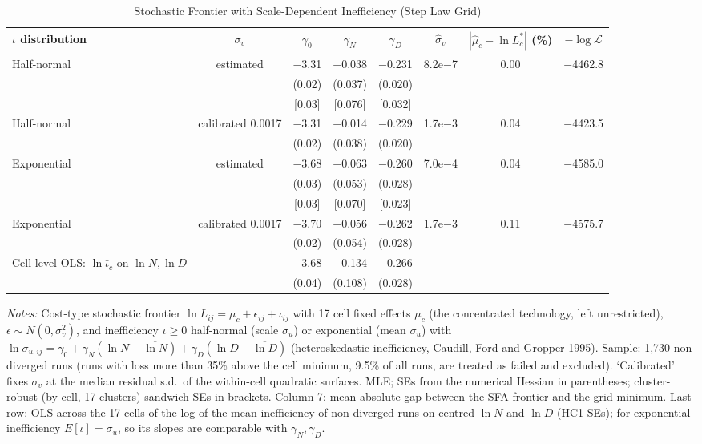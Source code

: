 \begin{table}[htbp]
\centering
\scriptsize
\begin{threeparttable}
\caption{Stochastic Frontier with Scale-Dependent Inefficiency (Step Law Grid)}
\label{tab:m8_sfa}
\begin{tabular}{lccccccc}
\toprule
$\iota$ distribution & $\sigma_v$ & $\gamma_0$ & $\gamma_N$ & $\gamma_D$ & $\hat\sigma_v$ & $|\hat\mu_c-\ln L^*_c|$ (\%) & $-\log\mathcal{L}$ \\
\midrule
Half-normal & estimated & $-$3.31 & $-$0.038 & $-$0.231 & 8.2e$-$7 & 0.00 & $-$4462.8 \\
 & & (0.02) & (0.037) & (0.020) & & &  \\
 & & [0.03] & [0.076] & [0.032] & & &  \\
Half-normal & calibrated 0.0017 & $-$3.31 & $-$0.014 & $-$0.229 & 1.7e$-$3 & 0.04 & $-$4423.5 \\
 & & (0.02) & (0.038) & (0.020) & & &  \\
Exponential & estimated & $-$3.68 & $-$0.063 & $-$0.260 & 7.0e$-$4 & 0.04 & $-$4585.0 \\
 & & (0.03) & (0.053) & (0.028) & & &  \\
 & & [0.03] & [0.070] & [0.023] & & &  \\
Exponential & calibrated 0.0017 & $-$3.70 & $-$0.056 & $-$0.262 & 1.7e$-$3 & 0.11 & $-$4575.7 \\
 & & (0.02) & (0.054) & (0.028) & & &  \\
\addlinespace
Cell-level OLS: $\ln\bar\iota_c$ on $\ln N,\ln D$ & -- & $-$3.68 & $-$0.134 & $-$0.266 & & &  \\
 & & (0.04) & (0.108) & (0.028) & & &  \\
\bottomrule
\end{tabular}
\begin{tablenotes}[flushleft]
\footnotesize
\item \textit{Notes:} Cost-type stochastic frontier $\ln L_{ij}=\mu_c+\epsilon_{ij}+\iota_{ij}$ with 17 cell fixed effects $\mu_c$ (the concentrated technology, left unrestricted), $\epsilon\sim N(0,\sigma_v^2)$, and inefficiency $\iota\geq0$ half-normal (scale $\sigma_u$) or exponential (mean $\sigma_u$) with $\ln\sigma_{u,ij}=\gamma_0+\gamma_N(\ln N-\overline{\ln N})+\gamma_D(\ln D-\overline{\ln D})$ (heteroskedastic inefficiency, Caudill, Ford and Gropper 1995). Sample: 1,730 non-diverged runs (runs with loss more than 35\% above the cell minimum, 9.5\% of all runs, are treated as failed and excluded). `Calibrated' fixes $\sigma_v$ at the median residual s.d.\ of the within-cell quadratic surfaces. MLE; SEs from the numerical Hessian in parentheses; cluster-robust (by cell, 17 clusters) sandwich SEs in brackets. Column 7: mean absolute gap between the SFA frontier and the grid minimum. Last row: OLS across the 17 cells of the log of the mean inefficiency of non-diverged runs on centred $\ln N$ and $\ln D$ (HC1 SEs); for exponential inefficiency $E[\iota]=\sigma_u$, so its slopes are comparable with $\gamma_N,\gamma_D$.
\end{tablenotes}
\end{threeparttable}
\end{table}
